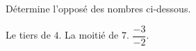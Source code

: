 %
%
Détermine l'opposé des nombres ci-dessous.
  \begin{tasks}
    \task Le tiers de $4$.
    \task La moitié de $7$.
    \task $\dfrac{-3}{-2}$.
  \end{tasks}
